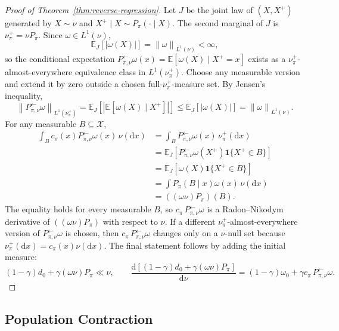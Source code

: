 \documentclass{article}
\newcommand{\sX}{\mathcal{X}}
\newcommand{\E}{\mathbb{E}}
\newcommand{\1}{\mathbf{1}}
\newcommand{\dd}{\mathrm{d}}
\newcommand{\nup}{\nu_\pi^+}
\newcommand{\cpi}{c_\pi}
\newcommand{\omegazero}{\omega_0}
\newcommand{\Pback}{P_{\pi,\nu}^{\leftarrow}}
\newcommand{\Mpi}{\Pback}
\newcommand{\Ppi}{P_\pi}
\newcommand{\dinit}{d_0}
\newcommand{\norm}[2][]{\left\lVert #2 \right\rVert_{#1}}
\newcommand{\LoneNu}[1]{\norm[L^1(\nu)]{#1}}
\newcommand{\LoneNuPlus}[1]{\norm[L^1(\nu_\pi^+)]{#1}}
\newcommand{\abs}[1]{\left\lvert #1 \right\rvert}
\theoremstyle{plain}
\theoremstyle{definition}
\theoremstyle{remark}
\begin{document}
\begin{proof}[Proof of Theorem~\ref{thm:reverse-regression}]
Let $J$ be the joint law of $(X,X^+)$ generated by $X\sim\nu$ and $X^+\mid X\sim\Ppi(\cdot\mid X)$.
The second marginal of $J$ is $\nup=\nu\Ppi$.
Since $\omega\in L^1(\nu)$,
\[
    \E_J[\abs{\omega(X)}]=\LoneNu{\omega}<\infty,
\]
so the conditional expectation $\Mpi\omega(x)=\E[\omega(X)\mid X^+=x]$ exists as a $\nup$-almost-everywhere equivalence class in $L^1(\nup)$.
Choose any measurable version and extend it by zero outside a chosen full-$\nup$-measure set.
By Jensen's inequality,
\[
    \LoneNuPlus{\Mpi\omega}
    =
    \E_J[\abs{\E[\omega(X)\mid X^+]}]
    \leq
    \E_J[\abs{\omega(X)}]
    =
    \LoneNu{\omega}.
\]
For any measurable $B\subseteq\sX$,
\[
\begin{aligned}
    \int_B \cpi(x)\Mpi\omega(x)\,\nu(\dd x)
    &=
    \int_B \Mpi\omega(x)\,\nup(\dd x)\\
    &=
    \E_J[\Mpi\omega(X^+)\1\{X^+\in B\}]\\
    &=
    \E_J[\omega(X)\1\{X^+\in B\}]\\
    &=
    \int \Ppi(B\mid x)\omega(x)\,\nu(\dd x)\\
    &=
    ((\omega\nu)\Ppi)(B).
\end{aligned}
\]
The equality holds for every measurable $B$, so $\cpi\,\Mpi\omega$ is a Radon--Nikodym derivative of $((\omega\nu)\Ppi)$ with respect to $\nu$.
If a different $\nup$-almost-everywhere version of $\Mpi\omega$ is chosen, then $\cpi\,\Mpi\omega$ changes only on a $\nu$-null set because $\nup(\dd x)=\cpi(x)\nu(\dd x)$.
The final statement follows by adding the initial measure:
\[
    (1-\gamma)\dinit+\gamma(\omega\nu)\Ppi
    \ll\nu,
    \qquad
    \frac{\dd[(1-\gamma)\dinit+\gamma(\omega\nu)\Ppi]}{\dd\nu}
    =
    (1-\gamma)\omegazero+\gamma\cpi\,\Mpi\omega.
\]
\end{proof}

\subsection{Population Contraction}
\end{document}
